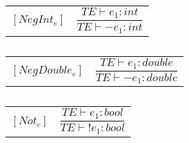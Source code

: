 \begin{table}[H]
    \begin{center}
    \begin{longtable}[c] { r c }
        $[NegInt_{e}]$ 
        & 
        \( \dfrac{T E  \vdash  e_1  :  int}{T E  \vdash  -e_1  :  int} \) 
    \end{longtable}
    \caption{}\label{type:int-neg}
        \end{center}
\end{table}

\begin{table}[H]
    \begin{center}
    \begin{longtable}[c] { r c }
        $[NegDouble_{e}]$ 
        & 
        \( \dfrac{T E  \vdash  e_1  :  double}{T E  \vdash  -e_1  :  double} \) 
    \end{longtable}
    \caption{}\label{type:double-neg}
        \end{center}
\end{table}

\begin{table}[H]
    \begin{center}
    \begin{longtable}[c] { r c }
        $[Not_{e}]$ 
        & 
        \( \dfrac{T E  \vdash  e_1  :  bool}{T E  \vdash  !e_1  :  bool} \) 
    \end{longtable}
    \caption{}\label{type:bool-neg}
        \end{center}
\end{table}

